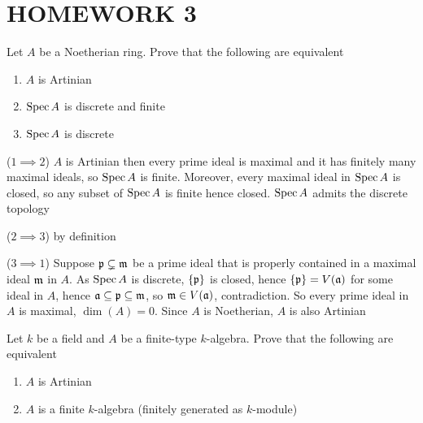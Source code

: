 \chapter{HOMEWORK 3}

\begin{problem}
	Let $A$ be a Noetherian ring. Prove that the following are equivalent
	\begin{enumerate}
		\item $A$ is Artinian
		\item $\operatorname{Spec} A$ is discrete and finite
		\item $\operatorname{Spec} A$ is discrete
	\end{enumerate}
\end{problem}

\begin{longproof}
	($1 \implies 2$) $A$ is Artinian then every prime ideal is maximal and it has finitely many maximal ideals, so $\operatorname{Spec} A$ is finite. Moreover, every maximal ideal in $\operatorname{Spec} A$ is closed, so any subset of $\operatorname{Spec} A$ is finite hence closed. $\operatorname{Spec} A$ admits the discrete topology
	
	($2 \implies 3$) by definition
	
	($3 \implies 1$) Suppose $\mathfrak{p} \subsetneq \mathfrak{m}$ be a prime ideal that is properly contained in a maximal ideal $\mathfrak{m}$ in $A$. As $\operatorname{Spec} A$ is discrete, $\{\mathfrak{p}\}$ is closed, hence $\{\mathfrak{p}\} = V(\mathfrak{a})$ for some ideal in $A$, hence $\mathfrak{a} \subseteq \mathfrak{p} \subseteq \mathfrak{m}$, so $\mathfrak{m} \in V(\mathfrak{a})$, contradiction. So every prime ideal in $A$ is maximal, $\dim(A) = 0$. Since $A$ is Noetherian, $A$ is also Artinian
\end{longproof}

\begin{problem}
	Let $k$ be a field and $A$ be a finite-type $k$-algebra. Prove that the following are equivalent
	\begin{enumerate}
		\item $A$ is Artinian
		\item $A$ is a finite $k$-algebra (finitely generated as $k$-module)
	\end{enumerate}
\end{problem}


